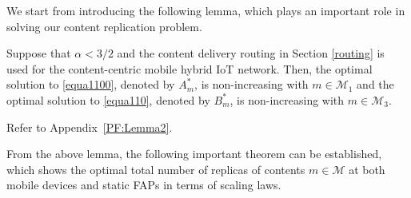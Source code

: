 \documentclass[10pt,journal,compsoc,onecolumn]{IEEEtran}
\begin{document}
We start from introducing the following lemma, which plays an important role in solving our content replication problem.

\begin{lemma} \label{m2}
Suppose that $\alpha < 3/2$ and the content delivery
routing in Section \ref{routing} is used for the content-centric
mobile hybrid IoT network. Then, the optimal solution to
\eqref{equa1100}, denoted by $A_m^*$, is non-increasing with $m
\in \mathcal{M}_1$ and the optimal solution to \eqref{equa110},
denoted by $B_m^*$, is non-increasing with $m \in \mathcal{M}_3$.
\end{lemma}

\begin{IEEEproof}
Refer to Appendix~\ref{PF:Lemma2}.
\end{IEEEproof}

From the above lemma, the following important theorem can be
established, which shows the optimal total number of replicas of
contents $m \in \mathcal{M}$ at both mobile devices and static FAPs in terms of scaling laws.
\end{document}
